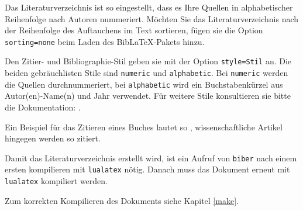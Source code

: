 Das Literaturverzeichnis ist so eingestellt, dass es Ihre Quellen in alphabetischer Reihenfolge nach Autoren nummeriert.
Möchten Sie das Literaturverzeichnis nach der Reihenfolge des Auftauchens im Text sortieren, fügen sie die Option \texttt{sorting=none} beim Laden
des BibLaTeX-Pakets hinzu.

Den Zitier- und Bibliographie-Stil geben sie mit der Option \texttt{style=Stil} an. Die beiden gebräuchlisten Stile sind \texttt{numeric} und \texttt{alphabetic}. 
Bei \texttt{numeric} werden die Quellen durchnummeriert, bei \texttt{alphabetic} wird ein Buchstabenkürzel aus Autor(en)-Name(n) und Jahr verwendet.
Für weitere Stile konsultieren sie bitte die Dokumentation: \cite{biblatex}.

Ein Beispiel für das Zitieren eines Buches lautet so \cite{handbook_adhesives}, wissenschaftliche Artikel hingegen werden so \cite{einstein,harvey_jms_2003} zitiert.

Damit das Literaturverzeichnis erstellt wird, ist ein Aufruf von \texttt{biber} nach einem ersten kompilieren mit \texttt{lualatex} nötig.
Danach muss das Dokument erneut mit \texttt{lualatex} kompiliert werden. 

Zum korrekten Kompilieren des Dokuments siehe Kapitel \ref{make}.
